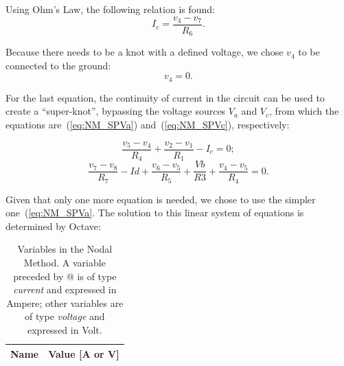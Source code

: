 Using Ohm’s Law, the following relation is found:
\begin{equation}
  I_c = \frac{v_4-v_7}{R_6}.
  \label{eq:NM_OhmIc}
\end{equation}

Because there needs to be a knot with a defined voltage, we chose $v_4$ to be connected to the ground:
\begin{equation}
  v_4 = 0.
  \label{eq:NM_v4=0}
\end{equation}

For the last equation, the continuity of current in the circuit can be used to create a “super-knot”, bypassing the voltage sources $V_a$ and $V_c$, from which the equations are~(\ref{eq:NM_SPVa}) and~(\ref{eq:NM_SPVc}), respectively:

\begin{equation}
  \frac{v_5-v_4}{R_4} + \frac{v_2-v_1}{R_1} - I_c = 0;
  \label{eq:NM_SPVa}
\end{equation}
\begin{equation}
  \frac{v_7-v_8}{R_7} - Id + \frac{v_6-v_5}{R_5} + \frac{Vb}{R3} + \frac{v_4-v_5}{R_4} = 0.
  \label{eq:NM_SPVc}
\end{equation}

Given that only one more equation is needed, we chose to use the simpler one~(\ref{eq:NM_SPVa}.
The solution to this linear system of equations is determined by Octave:

\begin{table}[h]
  \centering
  \begin{tabular}{|l|r|}
    \hline    
    {\bf Name} & {\bf Value [A or V]} \\ \hline
    
  \end{tabular}
  \caption{Variables in the Nodal Method. A variable preceded by @ is of type {\em current} and expressed in Ampere; other variables are of type {\em voltage} and expressed in Volt.}
  \label{tab:nos}
\end{table}